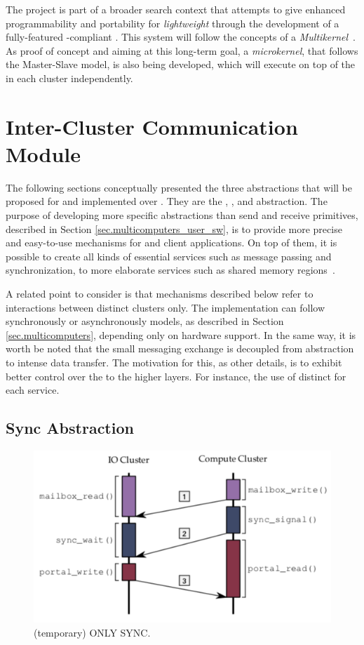 	The \hal project is part of a broader search context that
	attempts to give enhanced programmability and portability
	for \textit{lightweight \manycores} through the development
	of a fully-featured \posix-compliant \os.
	This system will follow the concepts of a \textit{Multikernel}~\cite{}.
	As proof of concept and aiming at this long-term goal,
	a \textit{microkernel}, that follows the Master-Slave model,
	is also being developed, which will execute on top of the \hal
	in each cluster independently.

\section{Inter-Cluster Communication Module}
\label{sec.intercluster_comm}

	The following sections conceptually presented the three abstractions
	that will be proposed for \hal and implemented over \mppa.
	They are the \sync, \mailbox, and \portal abstraction.
	The purpose of developing more specific abstractions than
	send and receive primitives, described in Section \ref{sec.multicomputers_user_sw},
	is to provide more precise and easy-to-use mechanisms for
	\os and client applications.
	On top of them, it is possible to create all kinds of essential
	services such as message passing and synchronization,
	to more elaborate services such as shared memory regions~\cite{rem}.

	A related point to consider is that mechanisms described below refer
	to interactions between distinct clusters only.
	The implementation can follow synchronously or asynchronously models,
	as described in Section \ref{sec.multicomputers}, depending only on hardware support.
	In the same way, it is worth be noted that the small messaging exchange
	is decoupled from abstraction to intense data transfer.
	The motivation for this, as other details, is to exhibit better control
	over the \qos to the higher layers.
	For instance, the use of distinct \nocs for each service.

		\subsection{Sync Abstraction}
		\label{sec.sync_abs}

			\begin{figure}[h]
				\centering
				\includegraphics[width=.7\textwidth]{images/conceptual-sync.png}

				\caption{
					(temporary) ONLY SYNC.
				}\par
				\label{fig.conpt_sync}
			\end{figure}

